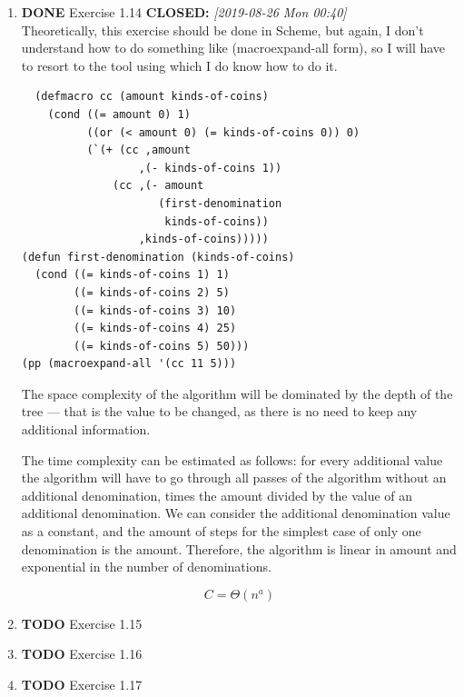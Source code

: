 \documentclass[11pt]{article}
\begin{document}
\begin{enumerate}
\begin{enumerate}
\item {\bfseries\sffamily DONE} Exercise 1.14
\label{sec:org68e3255}
\noindent\textbf{CLOSED:} \textit{[2019-08-26 Mon 00:40]}\\

Theoretically, this exercise should be done in Scheme, but again, I
don't understand how to do something like (macroexpand-all form), so I
will have to resort to the tool using which I do know how to do it.

\lstset{language=elisp,label=orgf5203ce,caption= ,captionpos=b,numbers=none}
\begin{lstlisting}
  (defmacro cc (amount kinds-of-coins)
    (cond ((= amount 0) 1)
          ((or (< amount 0) (= kinds-of-coins 0)) 0)
          (`(+ (cc ,amount
                  ,(- kinds-of-coins 1))
              (cc ,(- amount
                     (first-denomination
                      kinds-of-coins))
                  ,kinds-of-coins)))))
(defun first-denomination (kinds-of-coins)
  (cond ((= kinds-of-coins 1) 1)
        ((= kinds-of-coins 2) 5)
        ((= kinds-of-coins 3) 10)
        ((= kinds-of-coins 4) 25)
        ((= kinds-of-coins 5) 50)))
(pp (macroexpand-all '(cc 11 5)))

\end{lstlisting}

The space complexity of the algorithm will be dominated by the depth
of the tree — that is the value to be changed, as there is no need to
keep any additional information.

The time complexity can be estimated as follows: for every additional
value the algorithm will have to go through all passes of the
algorithm without an additional denomination, times the amount divided
by the value of an additional denomination. We can consider the
additional denomination value as a constant, and the amount of steps
for the simplest case of only one denomination is the
amount. Therefore, the algorithm is linear in amount and exponential
in the number of denominations.

\begin{equation}
\label{eq:14}
C = \Theta(n^a)
\end{equation}

\item {\bfseries\sffamily TODO} Exercise 1.15
\label{sec:org7c1e6a0}

\item {\bfseries\sffamily TODO} Exercise 1.16
\label{sec:org50b801e}

\item {\bfseries\sffamily TODO} Exercise 1.17
\label{sec:org5671655}


\end{enumerate}
\end{enumerate}
\end{document}
